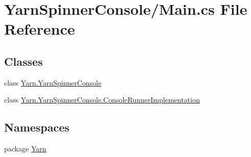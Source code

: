 \hypertarget{a00149}{\section{Yarn\-Spinner\-Console/\-Main.cs File Reference}
\label{a00149}
}
\subsection*{Classes}
\begin{DoxyCompactItemize}
\item 
class \hyperlink{a00106}{Yarn.\-Yarn\-Spinner\-Console}
\item 
class \hyperlink{a00044}{Yarn.\-Yarn\-Spinner\-Console.\-Console\-Runner\-Implementation}
\end{DoxyCompactItemize}
\subsection*{Namespaces}
\begin{DoxyCompactItemize}
\item 
package \hyperlink{a00040}{Yarn}
\end{DoxyCompactItemize}
